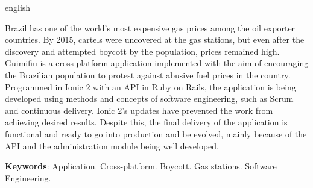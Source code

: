 \begin{resumo}[Abstract]
 \begin{otherlanguage*}{english}

     Brazil has one of the world's most expensive gas prices among the oil exporter countries. By 2015, cartels were uncovered at the gas stations, but even after the discovery and attempted boycott by the population, prices remained high. Guimifiu is a cross-platform application implemented with the aim of encouraging the Brazilian population to protest against abusive fuel prices in the country. Programmed in Ionic 2 with an API in Ruby on Rails, the application is being developed using methods and concepts of software engineering, such as Scrum and continuous delivery. Ionic 2's updates have prevented the work from achieving desired results. Despite this, the final delivery of the application is functional and ready to go into production and be evolved, mainly because of the API and the administration module being well developed.
     \vspace{\onelineskip}
        
     \noindent
     \textbf{Keywords}: Application. Cross-platform. Boycott. Gas stations. Software Engineering. 
 \end{otherlanguage*}
\end{resumo}
